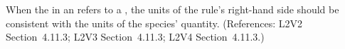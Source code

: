 When the  in an \AssignmentRule refers to a \Species, the
units of the rule's right-hand side should be consistent with the units of
the species' quantity.  (References: L2V2 Section~4.11.3;
L2V3 Section~4.11.3; L2V4 Section~4.11.3.)

